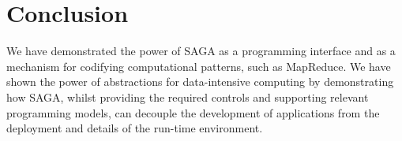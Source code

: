 \documentclass[conference,final]{IEEEtran}
\newcommand{\tc }{ $T_c$ }
\newcommand{\upp}{\vspace*{-0.5em}}
\begin{document}



\section{Conclusion}

We have demonstrated the power of SAGA as a programming interface and
as a mechanism for codifying computational patterns, such as
MapReduce.  We have shown the power of abstractions for data-intensive
computing by demonstrating how SAGA, whilst providing the required
controls and supporting relevant programming models, can decouple the
development of applications from the deployment and details of the
run-time environment.
\end{document}
